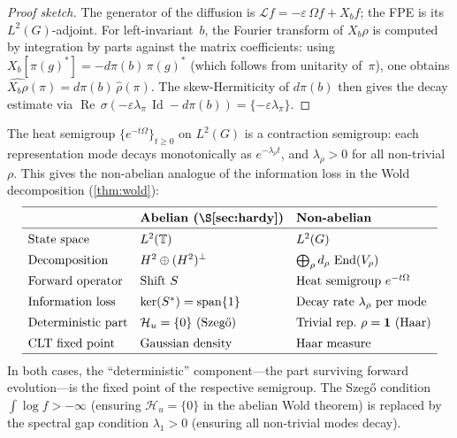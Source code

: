 \begin{proof}[Proof sketch]
The generator of the diffusion is $\mathcal{L}f = -\varepsilon\,\Omega f + X_b f$; the FPE is its $L^2(G)$-adjoint. For left-invariant~$b$, the Fourier transform of $X_b\rho$ is computed by integration by parts against the matrix coefficients: using $X_b[\pi(g)^*] = -d\pi(b)\,\pi(g)^*$ (which follows from unitarity of~$\pi$), one obtains $\widehat{X_b\rho}(\pi) = d\pi(b)\,\widehat{\rho}(\pi)$. The skew-Hermiticity of $d\pi(b)$ then gives the decay estimate via $\operatorname{Re}\,\sigma(-\varepsilon\lambda_\pi\,\operatorname{Id} - d\pi(b)) = \{-\varepsilon\lambda_\pi\}$.
\end{proof}

\begin{remark}
The heat semigroup $\{e^{-t\Omega}\}_{t \geq 0}$ on $L^2(G)$ is a contraction semigroup: each representation mode decays monotonically as $e^{-\lambda_\rho t}$, and $\lambda_\rho > 0$ for all non-trivial~$\rho$. This gives the non-abelian analogue of the information loss in the Wold decomposition (\cref{thm:wold}):
\[
\renewcommand{\arraystretch}{1.4}
\begin{array}{lll}
\hline
& \textbf{Abelian (\S\ref{sec:hardy})} & \textbf{Non-abelian} \\
\hline
\text{State space} & L^2(\bT) & L^2(G) \\
\text{Decomposition} & \Htwo \oplus (\Htwo)^\perp & \bigoplus_\rho d_\rho\, \operatorname{End}(V_\rho) \\
\text{Forward operator} & \text{Shift } S & \text{Heat semigroup } e^{-t\Omega} \\
\text{Information loss} & \ker(S^*) = \operatorname{span}\{1\} & \text{Decay rate } \lambda_\rho \text{ per mode} \\
\text{Deterministic part} & \mathcal{H}_u = \{0\} \text{ (Szeg\H{o})} & \text{Trivial rep.\ } \rho = \mathbf{1} \text{ (Haar)} \\
\text{CLT fixed point} & \text{Gaussian density} & \text{Haar measure} \\
\hline
\end{array}
\]
In both cases, the ``deterministic'' component---the part surviving forward evolution---is the fixed point of the respective semigroup. The Szeg\H{o} condition $\int \log f > -\infty$ (ensuring $\mathcal{H}_u = \{0\}$ in the abelian Wold theorem) is replaced by the spectral gap condition $\lambda_1 > 0$ (ensuring all non-trivial modes decay).
\end{remark}

